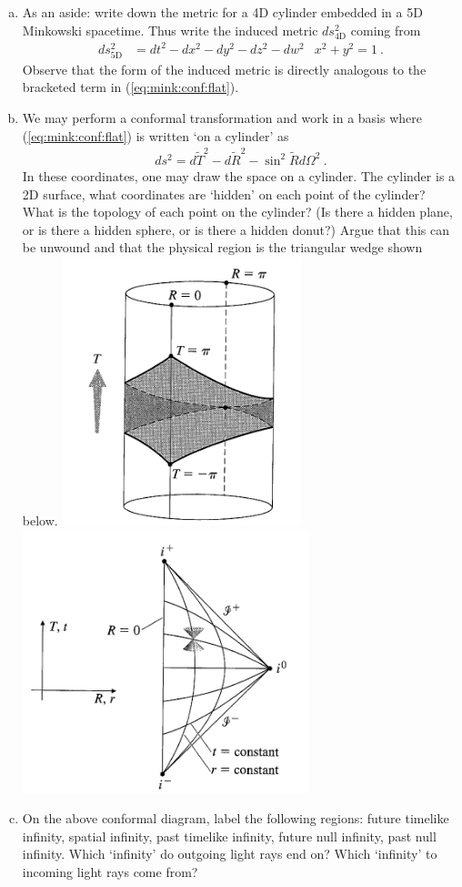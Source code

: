 \documentclass[12pt]{article}
\numberwithin{equation}{section}    %
\renewcommand{\tilde}{\widetilde}   %
\begin{document}
\begin{enumerate}[(a)]
\item As an aside: write down the metric for a 4D cylinder embedded in a 5D Minkowski spacetime. Thus write the induced metric $ds_\text{4D}^2$ coming from
\begin{align}
	ds_\text{5D}^2 &=  dt^2 - dx^2 - dy^2 - dz^2 - dw^2
	&
	x^2 + y^2 = 1 \ .
\end{align}
Observe that the form of the induced metric is directly analogous to the bracketed term in (\ref{eq:mink:conf:flat}). 
\item We may perform a conformal transformation and work in a basis where (\ref{eq:mink:conf:flat}) is written `on a cylinder' as
\begin{align}
	ds^2 = d\tilde T^2 - d\tilde R^2 -\sin^2 \tilde R d\Omega^2 \ .
\end{align}
In these coordinates, one may draw the space on a cylinder. The cylinder is a 2D surface, what coordinates are `hidden' on each point of the cylinder? What is the topology of each point on the cylinder? (Is there a hidden plane, or is there a hidden sphere, or is there a hidden donut?) Argue that this can be unwound and that the physical region is the triangular wedge shown below.
\includegraphics[width=.4\textwidth]{figures/ConfMink}
\includegraphics[width=.4\textwidth]{figures/confMink2}
\item On the above conformal diagram, label the following regions: future timelike infinity, spatial infinity, past timelike infinity, future null infinity, past null infinity. Which `infinity' do outgoing light rays end on? Which `infinity' to incoming light rays come from? 
\end{enumerate}





%
\end{document}

